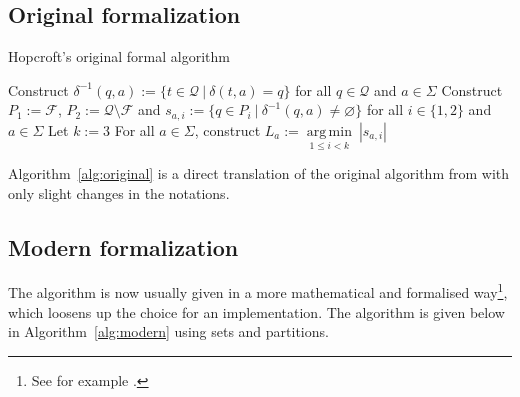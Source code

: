 \documentclass[12pt, a4 paper]{article}
\theoremstyle{definition}
\begin{document}
\subsection{Original formalization \faGears}

\begin{algorithm}[H]
\SetAlgoLined
\caption{Hopcroft's original formal algorithm}
\label{alg:original}
Construct $\delta^{-1}(q, a) := \{t \in \mathcal{Q}\ |\ \delta(t, a) = q\}$ for all $q \in \mathcal{Q}$ and $a \in \Sigma$ \;\label{alg:original:1}
Construct $P_1 := \mathcal{F}$, $P_2 := \mathcal{Q} \setminus \mathcal{F}$ and $s_{a,i} := \{q \in P_i \ | \ \delta^{-1}(q, a) \neq \varnothing \}$ for all $i \in \{1, 2\}$ and $a \in \Sigma$ \;
Let $k := 3$ \;
For all $a \in \Sigma$, construct $L_a := \underset{1 \leq i < k}{\operatorname*{arg\,min}}\ \left| s_{a, i} \right|$ \; \label{alg:original:4}
\end{algorithm}

\bigskip

Algorithm~\ref{alg:original} is a direct translation of the original algorithm from \cite{Hop71} with only slight changes in the notations.

\subsection{Modern formalization}

The algorithm is now usually given in a more mathematical and formalised way\footnote{See for example \cite{esparza2023automata}.}, which loosens up the choice for an implementation.
The algorithm is given below in Algorithm~\ref{alg:modern} using sets and partitions.
\end{document}
